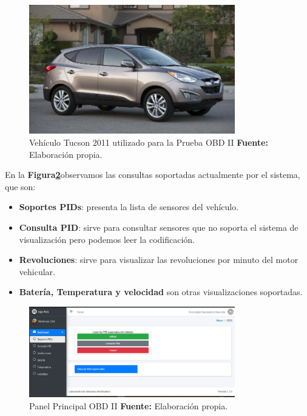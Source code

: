 \begin{figure}[H]
	\centering
	\includegraphics[width=0.8\textwidth]{./Cap6imagen/tucson_fig_c6.jpg}
	\caption [Vehículo Tucson 2011 utilizado para la Prueba OBD II.]{Vehículo Tucson 2011 utilizado para la Prueba OBD II \textbf{ Fuente:} %
		Elaboración propia.}
	\label{tucson_ref_c6} %
\end{figure}

En la \textbf{Figura\ref{panel_ref_c6}}observamos las consultas soportadas actualmente por el sistema, que son:
\begin{itemize}
    \item \textbf{Soportes PIDs}: presenta la lista de sensores del vehículo. 
    \item \textbf{Consulta PID}: sirve para consultar sensores que no soporta el sistema de visualización pero podemos leer la codificación. 
    \item \textbf{Revoluciones}: sirve para visualizar las revoluciones por minuto del motor vehicular.
    \item \textbf{Batería, Temperatura y velocidad} son otras visualizaciones soportadas.     
\end{itemize}



\begin{figure}[H]
	\centering
	\includegraphics[width=0.8\textwidth]{./Cap6imagen/soportes_fig_c6.png}
	\caption [Panel Principla OBD II.]{Panel Principal OBD II \textbf{ Fuente:} %
		Elaboración propia.}
	\label{panel_ref_c6} %
\end{figure}



